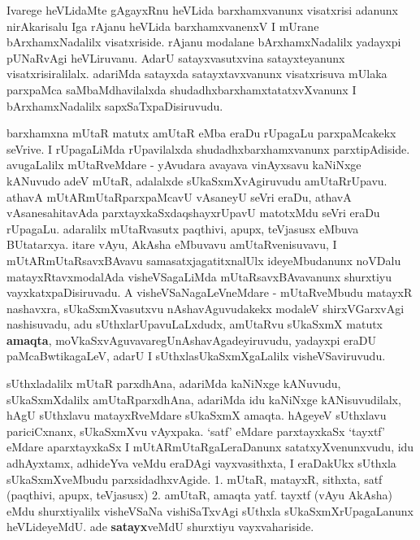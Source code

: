 
\centerline{}

\begin{artha}
 Ivarege heVLidaMte gAgayxRnu heVLida barxhamxvanunx visatxrisi
 adanunx nirAkarisalu Iga rAjanu heVLida barxhamxvanenxV I mUrane
 bArxhamxNadalilx visatxriside. rAjanu modalane bArxhamxNadalilx
 yadayxpi pUNaRvAgi heVLiruvanu. AdarU satayxvasutxvina satayxteyanunx
 visatxrisiralilalx. adariMda satayxda satayxtavxvanunx
 visatxrisuva mUlaka parxpaMca saMbaMdhavilalxda
 shudadhxbarxhamxtatatxvXvanunx I bArxhamxNadalilx sapxSaTxpaDisiruvudu.
\end{artha}

\centerline{}

\begin{artha}
barxhamxna mUtaR matutx amUtaR eMba eraDu rUpagaLu parxpaMcakekx
seVrive. I rUpagaLiMda rUpavilalxda shudadhxbarxhamxvanunx
parxtipAdiside. avugaLalilx  mUtaRveMdare - yAvudara avayava vinAyxsavu
kaNiNxge kANuvudo adeV mUtaR, adalalxde sUkaSxmXvAgiruvudu
amUtaRrUpavu. athavA mUtARmUtaR\-parxpaMcavU vAsaneyU seVri eraDu, athavA
vAsanesahitavAda parxtayxkaSxdaqshayxrUpavU matotxMdu seVri eraDu
rUpagaLu. adaralilx  mUtaRvasutx paqthivi, apupx, teVjasusx eMbuva
BUtatarxya. itare vAyu, AkAsha eMbuvavu amUtaRvenisuvavu, I
mUtARmUtaRsavxBAvavu samasatxjagatitxnalUlx ideyeMbudanunx noVDalu
matayxRtavxmodalAda visheVSagaLiMda mUtaRsavxBAvavanunx
shurxtiyu vayxkatxpaDisiruvadu. A visheVSaNagaLeVneMdare - mUtaRveMbudu
matayxR nashavxra, sUkaSxmXvasutxvu nAshavAguvudakekx modaleV
shirxVGarxvAgi nashisuvadu, adu sUthxla\-rUpavuLaLxdudx, amUtaRvu sUkaSxmX
matutx \textbf{amaqta}, moVkaSxvAguvavaregU\break nAshavAgadeyiruvudu,
yadayxpi eraDU paMcaBwtikagaLeV, adarU I sUthxlasUkaSxmXgaLalilx
visheVSaviruvudu.
\end{artha}

\begin{artha}
sUthxladalilx mUtaR parxdhAna, adariMda kaNiNxge kANuvudu,
sUkaSxmXdalilx amUtaRparxdhAna, adariMda idu kaNiNxge kANisuvudilalx,
hAgU sUthxlavu matayxRveMdare sUkaSxmX amaqta. hAgeyeV sUthxlavu
pariciCxnanx, sUkaSxmXvu vAyxpaka. {`satf'} eMdare parxtayxkaSx
{`tayxtf'}  eMdare aparxtayxkaSx I mUtARmUtaRgaLeraDanunx
satatxyXvenunxvudu, idu adhAyxtamx, adhideYva veMdu eraDAgi
vayxvasithxta, I eraDakUkx sUthxla sUkaSxmXveMbudu parxsidadhxvAgide.
1. mUtaR, matayxR, sithxta, satf (paqthivi, apupx, teVjasusx)
2. amUtaR, amaqta yatf. tayxtf (vAyu AkAsha)
eMdu shurxtiyalilx visheVSaNa vishiSaTxvAgi sUthxla
sUkaSxmXrUpagaLanunx heVLideyeMdU. ade \textbf{satayx}veMdU shurxtiyu vayxvahariside.
\end{artha}

